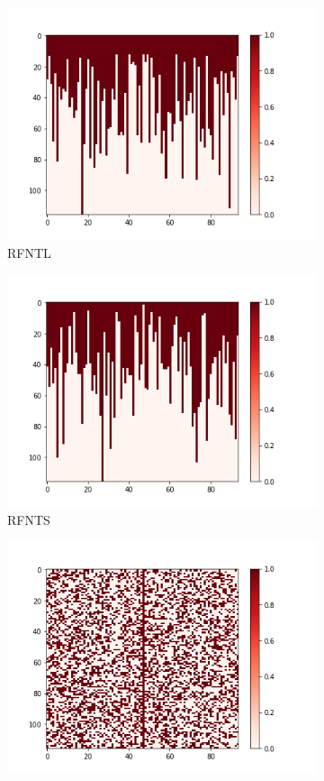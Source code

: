 \documentclass[10pt, conference, compsocconf]{IEEEtran}
\begin{document}
\begin{figure}[h!]
\begin{subfigure}[b]{0.45\columnwidth}
                  \includegraphics[width=\columnwidth]{figures/5vs7_random-triangular-largest_04_training}
                  \caption{RFNTL}
                  \label{fig:triangular-L-Sample-Training-set}
        \end{subfigure}
        \begin{subfigure}[b]{0.45\columnwidth}
                  \includegraphics[width=\columnwidth]{figures/5vs7_random-triangular-smallest_04_training}
                  \caption{RFNTS}
                  \label{fig:triangular-S-Sample-Training-set}
        \end{subfigure}
        \begin{subfigure}[b]{\columnwidth}
        \centering
        \includegraphics[width=0.45\columnwidth]{figures/5vs7_random-unreal_04_training}

\end{subfigure}
\end{figure}
\end{document}

